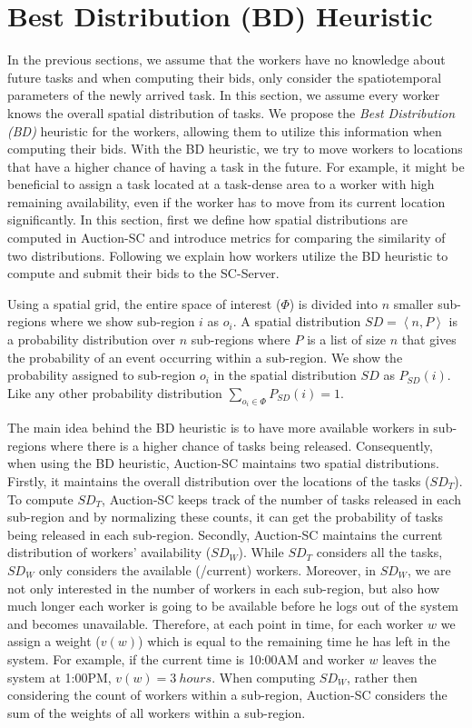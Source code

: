 \section{Best Distribution (BD) Heuristic}

In the previous sections, we assume that the workers have no knowledge about future tasks and when computing their bids, only consider the spatiotemporal parameters of the newly arrived task. In this section, we assume every worker knows the overall spatial distribution of tasks. We propose the \emph{Best Distribution (BD)} heuristic for the workers, allowing them to utilize this information when computing their bids. With the BD heuristic, we try to move workers to locations that have a higher chance of having a task in the future. For example, it might be beneficial to assign a task located at a task-dense area to a worker with high remaining availability, even if the worker has to move from its current location significantly. In this section, first we define how spatial distributions are computed in Auction-SC and introduce metrics for comparing the similarity of two distributions. Following we explain how workers utilize the BD heuristic to compute and submit their bids to the SC-Server.

\begin{definition}
Using a spatial grid, the entire space of interest ($\Phi$) is divided into $n$ smaller sub-regions where we show sub-region $i$ as $o_i$. A spatial distribution $SD = \left\langle n, P \right\rangle$ is a probability distribution over $n$ sub-regions where $P$ is a list of size $n$ that gives the probability of an event occurring within a sub-region. We show the probability assigned to sub-region $o_i$ in the spatial distribution $SD$ as $P_{SD}(i)$. Like any other probability distribution $\sum_{o_i \in \Phi} P_{SD}(i) = 1$.
\end{definition}

The main idea behind the BD heuristic is to have more available workers in sub-regions where there is a higher chance of tasks being released. Consequently, when using the BD heuristic, Auction-SC maintains two spatial distributions. Firstly, it maintains the overall distribution over the locations of the tasks ($SD_T$). To compute $SD_T$, Auction-SC keeps track of the number of tasks released in each sub-region and by normalizing these counts, it can get the probability of tasks being released in each sub-region. Secondly, Auction-SC maintains the current distribution of workers' availability ($SD_W$). While $SD_T$ considers all the tasks, $SD_W$ only considers the available (/current) workers. Moreover, in $SD_W$, we are not only interested in the number of workers in each sub-region, but also how much longer each worker is going to be available before he logs out of the system and becomes unavailable. Therefore, at each point in time, for each worker $w$ we assign a weight ($v(w)$) which is equal to the remaining time he has left in the system. For example, if the current time is 10:00AM and worker $w$ leaves the system at 1:00PM, $v(w) = 3 \ hours$. When computing $SD_W$, rather then considering the count of workers within a sub-region, Auction-SC considers the sum of the weights of all workers within a sub-region.

